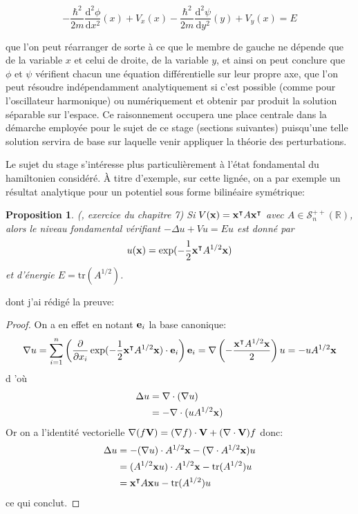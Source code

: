 \documentclass[svgnames,dvipsnames,a4paper,10pt,french]{report}
\newtheorem{proposition}[theorem]{Proposition}
\begin{document}
\begin{equation}
    -\frac{\hbar^2}{2m} \frac{\mathrm{d}^2 \phi}{\mathrm{d} x^2}(x) + V_x(x) -\frac{\hbar^2}{2m} \frac{\mathrm{d}^2\psi}{\mathrm{d} y^2}(y)
  + V_y(x) = E
\end{equation}

que l'on peut réarranger de sorte à ce que le membre de gauche ne dépende que de la variable $x$ et celui de droite, de la variable $y$, et ainsi on peut conclure que $\phi$ et $\psi$ vérifient chacun une équation différentielle sur leur propre axe, que l'on peut résoudre indépendamment analytiquement si c'est possible (comme pour l'oscillateur harmonique) ou numériquement et obtenir par produit la solution séparable sur l'espace. Ce raisonnement occupera une place centrale dans la démarche employée pour le sujet de ce stage (sections suivantes) puisqu'une telle solution servira de base sur laquelle venir appliquer la théorie des perturbations.

Le sujet du stage s'intéresse plus particulièrement à l'état fondamental du hamiltonien considéré. À titre d'exemple, sur cette lignée, on a par exemple un résultat analytique pour un potentiel sous forme bilinéaire symétrique:


\begin{proposition}{(\cite{allaire_analyse_2012}, exercice du chapitre 7)}
Si $V(\mathbf{x}) = \mathbf{x}^\intercal A \mathbf{x}^\intercal$ avec $A\in\mathscr{S}_n^{++}(\mathbb{R})$, alors le niveau fondamental vérifiant $-\Delta u + Vu = Eu$ est donné par
\begin{equation}
    u(\mathbf{x}) = \exp (- \frac{1}{2} \mathbf{x}^\intercal A^{1/2} \mathbf{x})
\end{equation}
et d'énergie $E = \mathrm{tr} (A^{1/2})$.
\end{proposition}

dont j'ai rédigé la preuve:
\begin{proof}
    On a en effet en notant $\mathbf{e}_i$ la base canonique:
    \begin{equation*}
        \nabla u = \sum_{i=1}^n \left( \frac{\partial}{\partial x_i}\exp(- \frac{1}{2}\mathbf{x}^\intercal A^{1/2} \mathbf{x}) \cdot \mathbf{e}_i \right) \mathbf{e}_i = \nabla \left( -\frac{\mathbf{x}^\intercal A^{1/2} \mathbf{x}}{2} \right) u = -u A^{1/2}\mathbf{x} 
    \end{equation*}
    d 'où
    \begin{align*}
        \Delta u &= \nabla \cdot (\nabla u) \\
        &= - \nabla \cdot (u A^{1/2}\mathbf{x}) 
    \end{align*}
    Or on a l'identité vectorielle $\nabla (f \mathbf{V}) = (\nabla f) \cdot \mathbf{V} + (\nabla \cdot \mathbf{V}) f$ donc:
    \begin{align*}
        \Delta u &= - (\nabla u) \cdot A^{1/2} \mathbf{x} - (\nabla \cdot A^{1/2} \mathbf{x}) u \\
        &= (A^{1/2} \mathbf{x} u )\cdot  A^{1/2} \mathbf{x} - \mathrm{tr}(A^{1/2}) u \\
        &= \mathbf{x}^\intercal A \mathbf{x}u -  \mathrm{tr}(A^{1/2})u
    \end{align*}
    ce qui conclut.
\end{proof}
\end{document}
